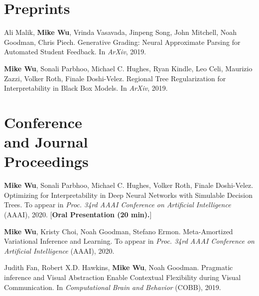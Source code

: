\documentclass[margin, 10pt]{res} %
\begin{document}
\begin{resume}



\section{Preprints}

Ali Malik, \textbf{Mike Wu}, Vrinda Vasavada, Jinpeng Song, John Mitchell, Noah Goodman, Chris Piech. Generative Grading: Neural Approximate Parsing for Automated Student Feedback. In \textit{ArXiv}, 2019.

\textbf{Mike Wu}, Sonali Parbhoo, Michael C. Hughes, Ryan Kindle, Leo Celi, Maurizio Zazzi, Volker Roth, Finale Doshi-Velez. Regional Tree Regularization for Interpretability in Black Box Models. In \textit{ArXiv}, 2019.

\section{Conference \\and Journal \\Proceedings}

\textbf{Mike Wu}, Sonali Parbhoo, Michael C. Hughes, Volker Roth, Finale Doshi-Velez. Optimizing for Interpretability in Deep Neural Networks with Simulable Decision Trees. To appear in \textit{Proc. 34rd AAAI Conference on Artificial Intelligence} (AAAI), 2020. [\textbf{Oral Presentation (20 min).}]

\textbf{Mike Wu}, Kristy Choi, Noah Goodman, Stefano Ermon. Meta-Amortized Variational Inference and Learning. To appear in \textit{Proc. 34rd AAAI Conference on Artificial Intelligence} (AAAI), 2020.

Judith Fan, Robert X.D. Hawkins, \textbf{Mike Wu}, Noah Goodman. Pragmatic inference and Visual Abstraction Enable Contextual Flexibility during Visual Communication. In \textit{Computational Brain and Behavior} (COBB), 2019.


\end{resume}
\end{document}
